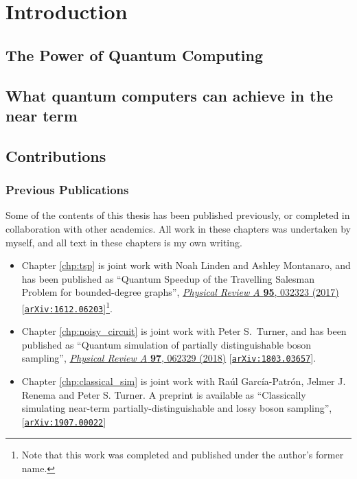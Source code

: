 \chapter{Introduction}

\section{The Power of Quantum Computing}

\section{What quantum computers can achieve in the near term}

\section{Contributions}

\subsection{Previous Publications}

Some of the contents of this thesis has been published previously, or completed in collaboration with other academics. All work in these chapters was undertaken by myself, and all text in these chapters is my own writing.

\begin{itemize}
\item Chapter \ref{chp:tsp} is joint work with Noah Linden and Ashley Montanaro, and has been published as ``Quantum Speedup of the Travelling Salesman Problem for bounded-degree graphs'', \href{https://link.aps.org/doi/10.1103/PhysRevA.95.032323}{\textit{Physical Review A} \textbf{95}, 032323 (2017)} [{\tt \href{https://arxiv.org/abs/1612.06203}{arXiv:1612.06203}}]\footnote{Note that this work was completed and published under the author's former name.}.

\item Chapter \ref{chp:noisy_circuit} is joint work with Peter S.\ Turner, and has been published as ``Quantum simulation of partially distinguishable boson sampling'', \href{https://link.aps.org/doi/10.1103/PhysRevA.97.062329}{\textit{Physical Review A} \textbf{97}, 062329 (2018)} [{\tt \href{https://arxiv.org/abs/1803.03657}{arXiv:1803.03657}}].

\item Chapter \ref{chp:classical_sim} is joint work with Ra\'{u}l Garc\'{i}a-Patr\'{o}n, Jelmer J. Renema and Peter S. Turner. A preprint is available as ``Classically simulating near-term partially-distinguishable and lossy boson sampling'', [{\tt \href{https://arxiv.org/abs/1907.00022}{arXiv:1907.00022}}]
\end{itemize}